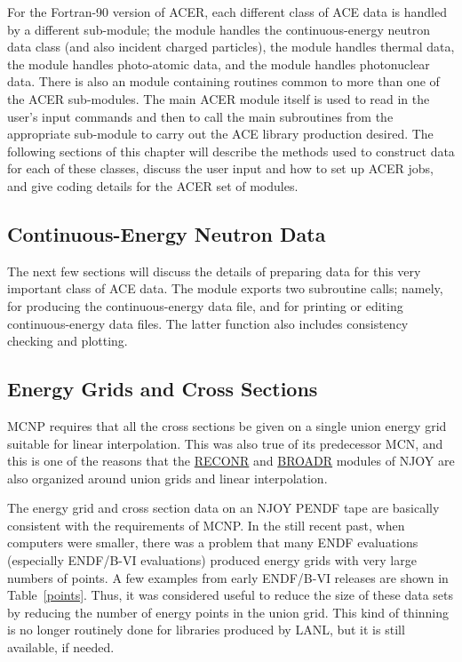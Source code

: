 For the Fortran-90 version of ACER, each different class of ACE data is
handled by a different sub-module; the module
 handles the
continuous-energy neutron data class (and also incident charged
particles), the module 
handles thermal data, the module
handles photo-atomic data, and the module
handles photonuclear data.  There is also an
module containing routines common to more than one of the ACER sub-modules.
The main ACER module itself 
is used to read in the user's
input commands and then to call the main subroutines from the
appropriate sub-module to carry out the ACE library production desired.
The following sections of this chapter will describe the methods used
to construct data for each of these classes, discuss the user input and
how to set up ACER jobs, and give coding details for the ACER set of
modules.

\subsection{Continuous-Energy Neutron Data}
\label{ssACER_n}

The next few sections will discuss the details of preparing data for
this very important class of ACE data.  The module  exports
two subroutine calls; namely,  for producing the
continuous-energy data file, and  for printing or editing
continuous-energy data files.  The latter function also includes
consistency checking and plotting.

\subsection{Energy Grids and Cross Sections}
\label{ssACER_grid}

MCNP requires that all the cross sections be given on a single union
energy grid suitable for linear interpolation.  This
was also true of its predecessor MCN\cite{MCN}, and this
is one of the reasons that the
\hyperlink{sRECONRhy}{RECONR} and
\hyperlink{sBROADRhy}{BROADR} modules of NJOY are
also organized around union grids and linear interpolation.

The energy grid and cross section data on an NJOY PENDF
tape are basically consistent with the requirements of MCNP.  In the
still recent past, when computers were smaller, there was a problem that
many ENDF evaluations (especially ENDF/B-VI evaluations) produced
energy grids with very large numbers of points.  A few examples from
early ENDF/B-VI releases are shown in Table~\ref{points}.  Thus, it
was considered useful to reduce the size of these data sets by reducing
the number of energy points in the union grid.  This kind of thinning
is no longer routinely done for libraries produced by LANL, but it is
still available, if needed.

